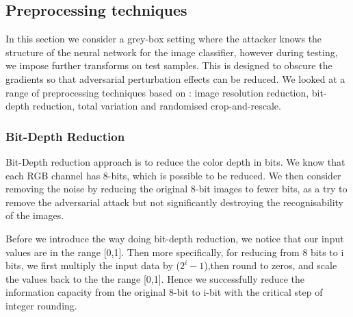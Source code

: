 \subsection{Preprocessing techniques}

In this section we consider a grey-box setting where the attacker knows the structure of the neural network for the image classifier, however during testing, we impose further transforms on test samples. This is designed to obscure the gradients so that adversarial perturbation effects can be reduced. We looked at a range of preprocessing techniques based on \cite{Guo18}: image resolution reduction, bit-depth reduction, total variation and randomised crop-and-rescale.


\subsubsection{Bit-Depth Reduction} %
Bit-Depth reduction approach is to reduce the color depth in bits. We know that each RGB channel has 8-bits, which is possible to be reduced. We then consider removing the noise by reducing the original 8-bit images to fewer bits, as a try to remove the adversarial attack but not significantly destroying the recognisability of the images. 

Before we introduce the way doing bit-depth reduction, we notice that our input values are in the range [0,1]. Then more specifically, for reducing from 8 bits to i bits, we first multiply the input data by ($2^i - 1$),then round to zeros, and scale the values back to the the range [0,1]. Hence we successfully reduce the information capacity from the original 8-bit to i-bit with the critical step of integer rounding. 




